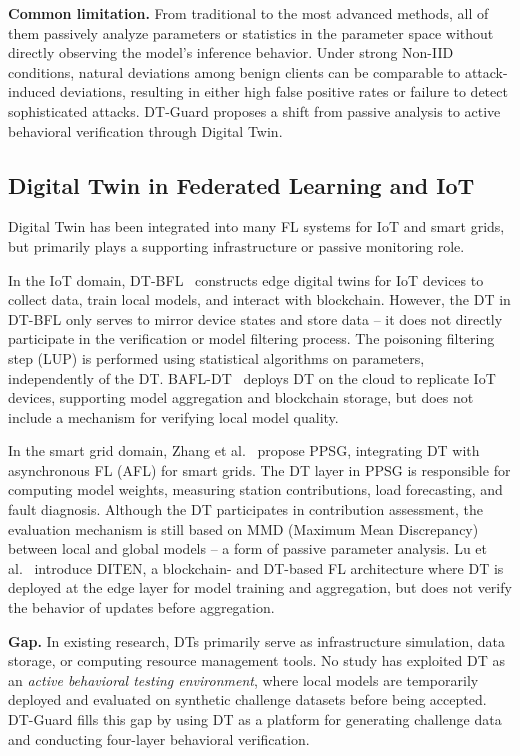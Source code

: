 \documentclass[runningheads]{llncs}
\begin{document}
\textbf{Common limitation.} From traditional to the most advanced methods, all of them passively analyze parameters or statistics in the parameter space without directly observing the model's inference behavior. Under strong Non-IID conditions, natural deviations among benign clients can be comparable to attack-induced deviations, resulting in either high false positive rates or failure to detect sophisticated attacks. DT-Guard proposes a shift from passive analysis to active behavioral verification through Digital Twin.

\subsection{Digital Twin in Federated Learning and IoT}

Digital Twin has been integrated into many FL systems for IoT and smart grids, but primarily plays a supporting infrastructure or passive monitoring role.

In the IoT domain, DT-BFL~\cite{issa2025dtbfl} constructs edge digital twins for IoT devices to collect data, train local models, and interact with blockchain. However, the DT in DT-BFL only serves to mirror device states and store data -- it does not directly participate in the verification or model filtering process. The poisoning filtering step (LUP) is performed using statistical algorithms on parameters, independently of the DT. BAFL-DT~\cite{qu2021bafldt} deploys DT on the cloud to replicate IoT devices, supporting model aggregation and blockchain storage, but does not include a mechanism for verifying local model quality.

In the smart grid domain, Zhang et al.~\cite{zhang2025ppsg} propose PPSG, integrating DT with asynchronous FL (AFL) for smart grids. The DT layer in PPSG is responsible for computing model weights, measuring station contributions, load forecasting, and fault diagnosis. Although the DT participates in contribution assessment, the evaluation mechanism is still based on MMD (Maximum Mean Discrepancy) between local and global models -- a form of passive parameter analysis. Lu et al.~\cite{lu2020diten} introduce DITEN, a blockchain- and DT-based FL architecture where DT is deployed at the edge layer for model training and aggregation, but does not verify the behavior of updates before aggregation.

\textbf{Gap.} In existing research, DTs primarily serve as infrastructure simulation, data storage, or computing resource management tools. No study has exploited DT as an \emph{active behavioral testing environment}, where local models are temporarily deployed and evaluated on synthetic challenge datasets before being accepted. DT-Guard fills this gap by using DT as a platform for generating challenge data and conducting four-layer behavioral verification.
\end{document}

